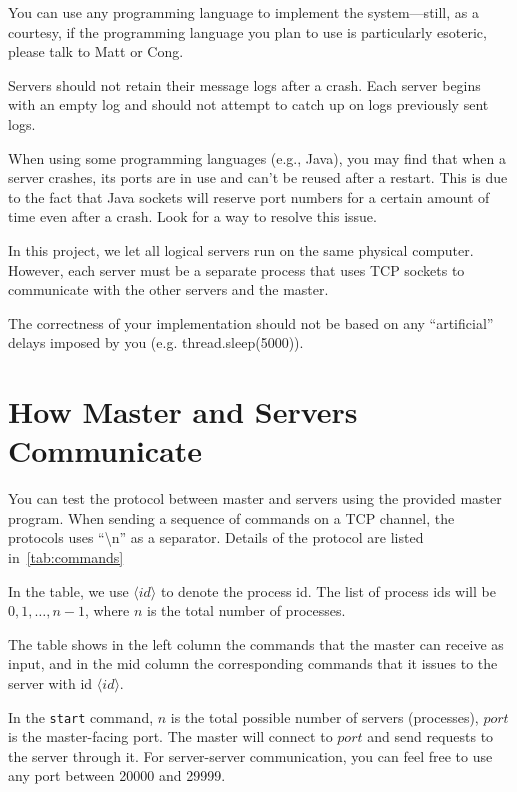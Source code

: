 \documentclass[11pt]{article}
\begin{document}
    \begin{compactitem}
        \item You can use any programming language to implement the system---still, as a courtesy, if the programming language you plan to use is particularly esoteric, please talk to Matt or Cong.
        \item Servers should not retain their message logs after a crash.
        Each server begins with an empty log and should not attempt to catch up on logs previously sent logs.
        \item When using some programming languages (e.g., Java), you may find that when a server crashes, its ports are in use and can't be reused after a restart.
        This is due to the fact that Java sockets will reserve port numbers for a certain amount of time even after a crash.
        Look for a way to resolve this issue.
        \item In this project, we let all logical servers run on the same physical computer.
        However, each server must be a separate process that uses TCP sockets to communicate with the other servers and the master.
        \item The correctness of your implementation should not be based on any ``artificial'' delays imposed by you (e.g. thread.sleep(5000)).
    \end{compactitem}

    \section{How Master and Servers Communicate}\label{sec:howMasterAndServersCommunicate}
    You can test the protocol between master and servers using the provided master program.
    When sending a sequence of commands on a TCP channel, the protocols uses ``\textbackslash n'' as a separator.
    Details of the protocol are listed in~\autoref{tab:commands}

    In the table, we use $\langle id\rangle$ to denote the process id.
    The list of process ids will be $0,1,\dots,n-1$, where $n$ is the total number of processes.

    The table shows in the left column the commands that the master can receive as input, and in the mid column the corresponding commands that it issues to the server with id $\langle id\rangle$.

    In the \texttt{start} command, $n$ is the total possible number of servers
    (processes), $port$ is the master-facing port.
    The master will connect to $port$ and send requests to the server through it.
    For server-server communication, you can feel free to use any port between 20000 and 29999.
\end{document}
